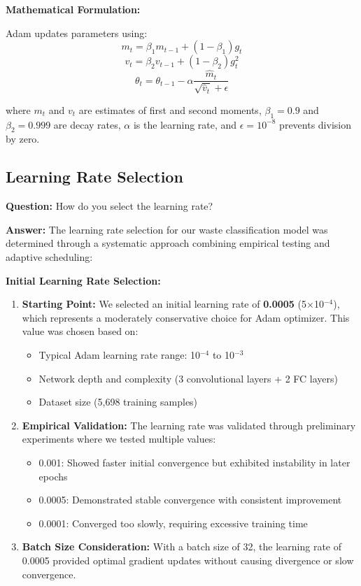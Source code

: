 \documentclass[12pt,a4paper]{article}
\begin{document}
\textbf{Mathematical Formulation:}

Adam updates parameters using:
\begin{equation}
m_t = \beta_1 m_{t-1} + (1-\beta_1)g_t
\end{equation}
\begin{equation}
v_t = \beta_2 v_{t-1} + (1-\beta_2)g_t^2
\end{equation}
\begin{equation}
\theta_t = \theta_{t-1} - \alpha \frac{\hat{m}_t}{\sqrt{\hat{v}_t}+\epsilon}
\end{equation}

where $m_t$ and $v_t$ are estimates of first and second moments, $\beta_1=0.9$ and $\beta_2=0.999$ are decay rates, $\alpha$ is the learning rate, and $\epsilon=10^{-8}$ prevents division by zero.

\subsection{Learning Rate Selection}

\textbf{Question:} How do you select the learning rate?

\textbf{Answer:} The learning rate selection for our waste classification model was determined through a systematic approach combining empirical testing and adaptive scheduling:

\textbf{Initial Learning Rate Selection:}

\begin{enumerate}
    \item \textbf{Starting Point:} We selected an initial learning rate of \textbf{0.0005} (5×10$^{-4}$), which represents a moderately conservative choice for Adam optimizer. This value was chosen based on:
    \begin{itemize}
        \item Typical Adam learning rate range: 10$^{-4}$ to 10$^{-3}$
        \item Network depth and complexity (3 convolutional layers + 2 FC layers)
        \item Dataset size (5,698 training samples)
    \end{itemize}
    
    \item \textbf{Empirical Validation:} The learning rate was validated through preliminary experiments where we tested multiple values:
    \begin{itemize}
        \item 0.001: Showed faster initial convergence but exhibited instability in later epochs
        \item 0.0005: Demonstrated stable convergence with consistent improvement
        \item 0.0001: Converged too slowly, requiring excessive training time
    \end{itemize}
    
    \item \textbf{Batch Size Consideration:} With a batch size of 32, the learning rate of 0.0005 provided optimal gradient updates without causing divergence or slow convergence.
\end{enumerate}
\end{document}
